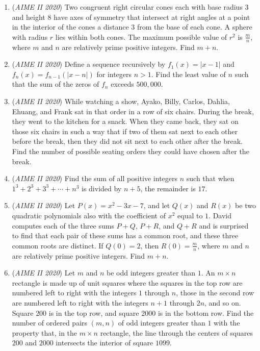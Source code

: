 \begin{enumerate}
 

	\item (\textit{AIME II 2020}) Two congruent right circular cones each with base radius $3$ and height $8$ have axes of symmetry that intersect at right angles at a point in the interior of the cones a distance $3$ from the base of each cone. A sphere with radius $r$ lies within both cones. The maximum possible value of $r^2$ is $\frac{m}{n}$, where $m$ and $n$ are relatively prime positive integers. Find $m+n$.


 

	\item (\textit{AIME II 2020}) Define a sequence recursively by $f_1(x)=|x-1|$ and $f_n(x)=f_{n-1}(|x-n|)$ for integers $n>1$. Find the least value of $n$ such that the sum of the zeros of $f_n$ exceeds $500,000$.


 

	\item (\textit{AIME II 2020}) While watching a show, Ayako, Billy, Carlos, Dahlia, Ehuang, and Frank sat in that order in a row of six chairs. During the break, they went to the kitchen for a snack. When they came back, they sat on those six chairs in such a way that if two of them sat next to each other before the break, then they did not sit next to each other after the break. Find the number of possible seating orders they could have chosen after the break.


 

	\item (\textit{AIME II 2020}) Find the sum of all positive integers $n$ such that when $1^3+2^3+3^3+\cdots +n^3$ is divided by $n+5$, the remainder is $17$.


 

	\item (\textit{AIME II 2020}) Let $P(x) = x^2 - 3x - 7$, and let $Q(x)$ and $R(x)$ be two quadratic polynomials also with the coefficient of $x^2$ equal to $1$. David computes each of the three sums $P + Q$, $P + R$, and $Q + R$ and is surprised to find that each pair of these sums has a common root, and these three common roots are distinct. If $Q(0) = 2$, then $R(0) = \frac{m}{n}$, where $m$ and $n$ are relatively prime positive integers. Find $m + n$.


 

	\item (\textit{AIME II 2020}) Let $m$ and $n$ be odd integers greater than $1.$ An $m\times n$ rectangle is made up of unit squares where the squares in the top row are numbered left to right with the integers $1$ through $n$, those in the second row are numbered left to right with the integers $n + 1$ through $2n$, and so on. Square $200$ is in the top row, and square $2000$ is in the bottom row. Find the number of ordered pairs $(m,n)$ of odd integers greater than $1$ with the property that, in the $m\times n$ rectangle, the line through the centers of squares $200$ and $2000$ intersects the interior of square $1099$.



\end{enumerate}

